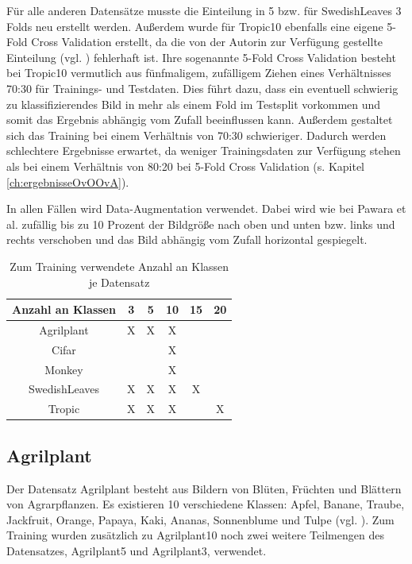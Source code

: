 Für alle anderen Datensätze musste die Einteilung in 5 bzw. für SwedishLeaves 3 Folds neu erstellt werden.
Außerdem wurde für Tropic10 ebenfalls eine eigene 5-Fold Cross Validation erstellt, da die von der Autorin zur Verfügung gestellte Einteilung (vgl. \cite{pawaraWebsiteDatensaetze}) fehlerhaft ist. Ihre sogenannte 5-Fold Cross Validation besteht bei Tropic10 vermutlich aus fünfmaligem, zufälligem Ziehen eines Verhältnisses 70:30 für Trainings- und Testdaten. Dies führt dazu, dass ein eventuell schwierig zu klassifizierendes Bild in mehr als einem Fold im Testsplit vorkommen und somit das Ergebnis abhängig vom Zufall beeinflussen kann. Außerdem gestaltet sich das Training bei einem Verhältnis von 70:30 schwieriger. Dadurch werden schlechtere Ergebnisse erwartet, da weniger Trainingsdaten zur Verfügung stehen als bei einem Verhältnis von 80:20 bei 5-Fold Cross Validation (s. Kapitel \ref{ch:ergebnisseOvOOvA}).


In allen Fällen wird Data-Augmentation verwendet. Dabei wird wie bei Pawara et al. \cite{pawaraPaper, pawaraWebsiteCode} zufällig bis zu 10 Prozent der Bildgröße nach oben und unten bzw. links und rechts verschoben und das Bild abhängig vom Zufall horizontal gespiegelt.

\begin{table}
\centering
\begin{tabular}{|c|c|c|c|c|c|}
\hline 
Anzahl an Klassen & 3 & 5 & 10 & 15 & 20 \\ 
\hline 
Agrilplant & X & X & X &  &  \\ 
Cifar &  &  & X &  &  \\ 
Monkey &  &  & X &  &  \\ 
SwedishLeaves & X & X & X & X &  \\ 
Tropic & X & X & X & & X \\ 
\hline 
\end{tabular} 
\caption{Zum Training verwendete Anzahl an Klassen je Datensatz}
\label{fig:DatensatzKlassen}
\end{table}

\subsection{Agrilplant}
Der Datensatz Agrilplant \cite{pawaraWebsiteDatensaetze} besteht aus Bildern von Blüten, Früchten und Blättern von Agrarpflanzen.
Es existieren 10 verschiedene Klassen: Apfel, Banane, Traube, Jackfruit, Orange, Papaya, Kaki, Ananas, Sonnenblume und Tulpe (vgl. \cite{pawaraWebsiteDatensaetze}).
Zum Training wurden zusätzlich zu Agrilplant10 noch zwei weitere Teilmengen des Datensatzes, Agrilplant5 und Agrilplant3, verwendet.

